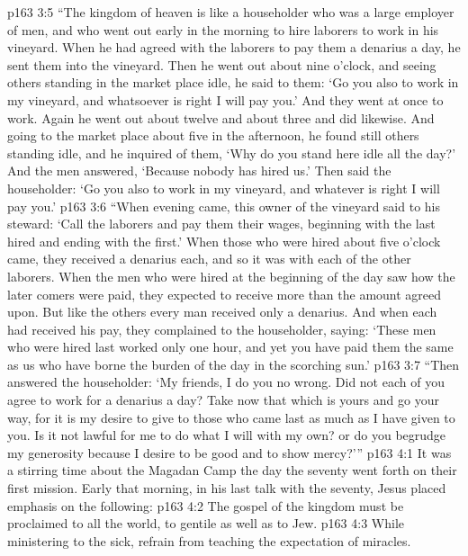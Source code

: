\vs p163 3:5 \textcolor{ubdarkred}{“The kingdom of heaven is like a householder who was a large employer of men, and who went out early in the morning to hire laborers to work in his vineyard. When he had agreed with the laborers to pay them a denarius a day, he sent them into the vineyard. Then he went out about nine o’clock, and seeing others standing in the market place idle, he said to them: ‘Go you also to work in my vineyard, and whatsoever is right I will pay you.’ And they went at once to work. Again he went out about twelve and about three and did likewise. And going to the market place about five in the afternoon, he found still others standing idle, and he inquired of them, ‘Why do you stand here idle all the day?’ And the men answered, ‘Because nobody has hired us.’ Then said the householder: ‘Go you also to work in my vineyard, and whatever is right I will pay you.’}
\vs p163 3:6 \textcolor{ubdarkred}{“When evening came, this owner of the vineyard said to his steward: ‘Call the laborers and pay them their wages, beginning with the last hired and ending with the first.’ When those who were hired about five o’clock came, they received a denarius each, and so it was with each of the other laborers. When the men who were hired at the beginning of the day saw how the later comers were paid, they expected to receive more than the amount agreed upon. But like the others every man received only a denarius. And when each had received his pay, they complained to the householder, saying: ‘These men who were hired last worked only one hour, and yet you have paid them the same as us who have borne the burden of the day in the scorching sun.’}
\vs p163 3:7 \textcolor{ubdarkred}{“Then answered the householder: ‘My friends, I do you no wrong. Did not each of you agree to work for a denarius a day? Take now that which is yours and go your way, for it is my desire to give to those who came last as much as I have given to you. Is it not lawful for me to do what I will with my own? or do you begrudge my generosity because I desire to be good and to show mercy?’”}
\vs p163 4:1 It was a stirring time about the Magadan Camp the day the seventy went forth on their first mission. Early that morning, in his last talk with the seventy, Jesus placed emphasis on the following:
\vs p163 4:2 \bibnobreakspace The gospel of the kingdom must be proclaimed to all the world, to gentile as well as to Jew.
\vs p163 4:3 \pc {}\bibnobreakspace While ministering to the sick, refrain from teaching the expectation of miracles.
